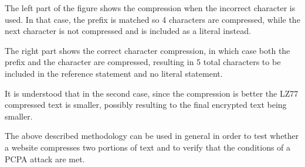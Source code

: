 The left part of the figure shows the compression when the incorrect character
is used. In that case, the prefix is matched so 4 characters are compressed,
while the next character is not compressed and is included as a literal instead.

The right part shows the correct character compression, in which case both the
prefix and the character are compressed, resulting in 5 total characters to be
included in the reference statement and no literal statement.

It is understood that in the second case, since the compression is better the
LZ77 compressed text is smaller, possibly resulting to the final encrypted text
being smaller.

The above described methodology can be used in general in order to test whether
a website compresses two portions of text and to verify that the conditions of a
PCPA attack are met.
